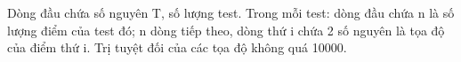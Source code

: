 Dòng đầu chứa số nguyên T, số lượng test. Trong mỗi test: dòng đầu chứa n là số lượng điểm của test đó; n dòng tiếp theo, dòng thứ i chứa 2 số nguyên là tọa độ của điểm thứ i. Trị tuyệt đối của các tọa độ không quá 10000.